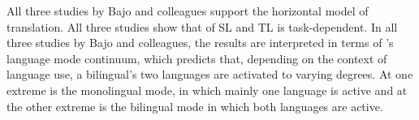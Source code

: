 \documentclass[output=paper]{LSP/langsci}
\begin{document}
All three studies by Bajo and colleagues support the horizontal model of translation. All three studies show that  of SL and TL is task-dependent. In all three studies by Bajo and colleagues, the results are interpreted in terms of \citeauthor{Grosjean1997}'s \citeyearpar{Grosjean1997} language mode continuum, which predicts that, depending on the context of language use, a bilingual's two languages are activated to varying degrees. At one extreme is the monolingual mode, in which mainly one language is active and at the other extreme is the bilingual mode in which both languages are active.

% 
% 
\end{document}
